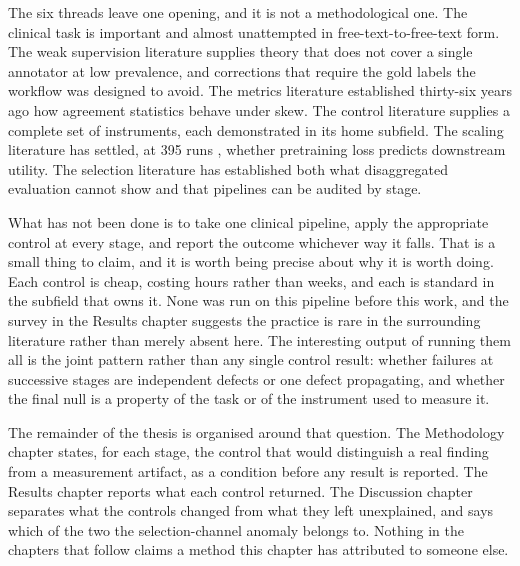 The six threads leave one opening, and it is not a methodological one. The clinical task is
important and almost unattempted in free-text-to-free-text form. The weak supervision
literature supplies theory that does not cover a single annotator at low prevalence, and
corrections that require the gold labels the workflow was designed to avoid. The metrics
literature established thirty-six years ago how agreement statistics behave under skew. The
control literature supplies a complete set of instruments, each demonstrated in its home
subfield. The scaling literature has settled, at 395 runs \citep{feng2026tessera}, whether pretraining loss predicts
downstream utility. The selection literature has established both what disaggregated
evaluation cannot show and that pipelines can be audited by stage.

What has not been done is to take one clinical pipeline, apply the appropriate control at
every stage, and report the outcome whichever way it falls. That is a small thing to claim,
and it is worth being precise about why it is worth doing. Each control is cheap, costing
hours rather than weeks, and each is standard in the subfield that owns it. None was run on
this pipeline before this work, and the survey in the Results chapter suggests the practice
is rare in the surrounding literature rather than merely absent here. The interesting output
of running them all is the joint pattern rather than any single control result: whether
failures at successive stages are independent defects or one defect propagating, and whether
the final null is a property of the task or of the instrument used to measure it.

The remainder of the thesis is organised around that question. The Methodology chapter
states, for each stage, the control that would distinguish a real finding from a measurement
artifact, as a condition before any result is reported. The Results chapter reports what each
control returned. The Discussion chapter separates what the controls changed from what they
left unexplained, and says which of the two the selection-channel anomaly belongs to. Nothing
in the chapters that follow claims a method this chapter has attributed to someone else.
